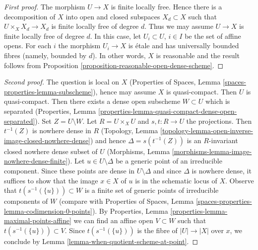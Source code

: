 \begin{proof}[First proof]
The morphism $U \to X$ is finite locally free. Hence there is a decomposition
of $X$ into open and closed subspaces $X_d \subset X$ such that
$U \times_X X_d \to X_d$ is finite locally free of degree $d$.
Thus we may assume $U \to X$ is finite locally free of degree $d$.
In this case, let $U_i \subset U$, $i \in I$ be the set of affine opens.
For each $i$ the morphism $U_i \to X$ is \'etale and has
universally bounded fibres (namely, bounded by $d$).
In other words, $X$ is reasonable and
the result follows from
Proposition \ref{proposition-reasonable-open-dense-scheme}.
\end{proof}

\begin{proof}[Second proof]
The question is local on $X$
(Properties of Spaces, Lemma \ref{spaces-properties-lemma-subscheme}),
hence may assume $X$ is quasi-compact. Then $U$ is quasi-compact.
Then there exists a dense open subscheme $W \subset U$ which is
separated (Properties, Lemma
\ref{properties-lemma-quasi-compact-dense-open-separated}).
Set $Z = U \setminus W$.
Let $R = U \times_X U$ and $s, t : R \to U$ the projections.
Then $t^{-1}(Z)$ is nowhere dense in $R$
(Topology, Lemma \ref{topology-lemma-open-inverse-image-closed-nowhere-dense})
and hence $\Delta = s(t^{-1}(Z))$ is an $R$-invariant
closed nowhere dense subset of $U$
(Morphisms, Lemma \ref{morphisms-lemma-image-nowhere-dense-finite}).
Let $u \in U \setminus \Delta$ be a generic point of an
irreducible component. Since these points are dense in $U \setminus \Delta$
and since $\Delta$ is nowhere dense, it suffices to show that the image
$x \in X$ of $u$ is in the schematic locus of $X$.
Observe that $t(s^{-1}(\{u\})) \subset W$ is a
finite set of generic points of irreducible components of $W$
(compare with
Properties of Spaces, Lemma
\ref{spaces-properties-lemma-codimension-0-points}).
By Properties, Lemma \ref{properties-lemma-maximal-points-affine}
we can find an affine open $V \subset W$ such that
$t(s^{-1}(\{u\})) \subset V$. Since $t(s^{-1}(\{u\}))$ is the fibre
of $|U| \to |X|$ over $x$, we conclude by
Lemma \ref{lemma-when-quotient-scheme-at-point}.
\end{proof}


